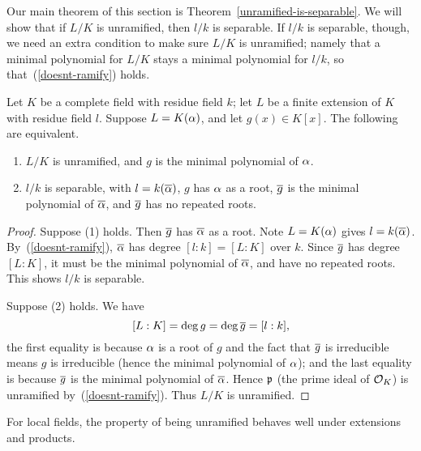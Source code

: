 Our main theorem of this section is Theorem~\ref{unramified-is-separable}. We will show that if $L/K$ is unramified, then $l/k$ is separable. If $l/k$ is separable, though, we need an extra condition to make sure $L/K$ is unramified; namely that a minimal polynomial for $L/K$ stays a minimal polynomial for $l/k$, so that~(\ref{doesnt-ramify}) holds.
\begin{pr}
Let $K$ be a complete field with residue field $k$; let $L$ be a finite extension of $K$ with residue field $l$. Suppose $L=K(\alpha)$, and let $g(x)\in K[x]$.
The following are equivalent.
\begin{enumerate}
\item $L/K$ is unramified, and $g$ is the minimal polynomial of $\alpha$.
\item $l/k$ is separable, with $l=k(\overline{\alpha})$, $g$ has $\alpha$ as a root, $\overline{g}$ is the minimal polynomial of $\overline{\alpha}$, and $\overline{g}$ has no repeated roots.
\end{enumerate}
\end{pr}
\begin{proof}
Suppose (1) holds. Then $\overline{g}$ has $\overline{\alpha}$ as a root. Note $L=K(\alpha)$ gives $l=k(\overline{\alpha})$. By~(\ref{doesnt-ramify}), $\overline{\alpha}$ has degree $[l:k]=[L:K]$ over $k$. Since $\overline{g}$ has degree $[L:K]$, it must be the minimal polynomial of $\overline{\alpha}$, and have no repeated roots. This shows $l/k$ is separable.

Suppose (2) holds. We have
\[
[L:K]= \deg g=\deg \overline{g}= [l:k],
\]
the first equality is because $\alpha$ is a root of $g$ and the fact that $\overline{g}$ is irreducible means $g$ is irreducible (hence the minimal polynomial of $\alpha$); and 
the last equality is because $\overline{g}$ is the minimal polynomial of $\overline{\alpha}$. %
Hence $\mathfrak{p}$ (the prime ideal of $\mathcal{O}_K$) is unramified by~(\ref{doesnt-ramify}). %
Thus $L/K$ is unramified.
\end{proof}
For local fields, the property of being unramified behaves well under extensions and products.
